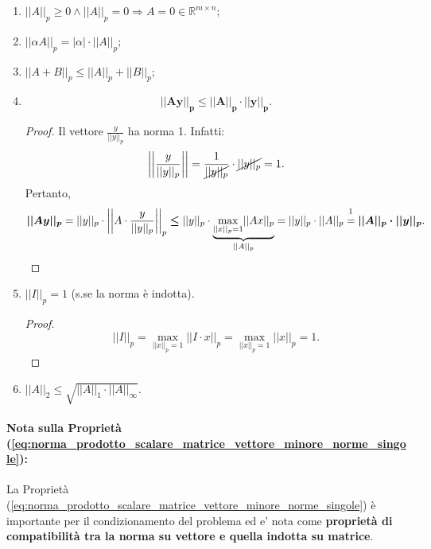 \begin{property}\label{prop:norme_indotte_matrici}
	\begin{enumerate}
		\item $||A||_p\geq 0 \wedge ||A||_p=0 \Rightarrow A=0\in\mathbb{R}^{m\times n};$
		\item $||\alpha A||_p=|\alpha|\cdot||A||_p;$
		\item $||A+B||_p\leq||A||_p+||B||_p;$
		\item 
		\begin{equation}\label{eq:norma_prodotto_scalare_matrice_vettore_minore_norme_singole}
			\boldsymbol{||Ay||_p\leq ||A||_p\cdot||y||_p}.
		\end{equation}
		\begin{proof}
			Il vettore $\frac{y}{||y||_p}$ ha norma 1. Infatti:
			\begin{equation}
				\left|\left|\frac{y}{||y||_p}\right|\right|=\frac{1}{\cancel{||y||_p}}\cdot\cancel{||y||_p}=1.
			\end{equation}
			Pertanto,
			\begin{equation*}
				\boldsymbol{||Ay||_p}=||y||_p\cdot\left|\left|A\cdot\frac{y}{||y||_p}\right|\right|_p\boldsymbol\leq ||y||_p\cdot\underbrace{\underset{||x||_p=1}{\max}||Ax||_p}_{||A||_p}=||y||_p\cdot||A||_p\overset{\footnotemark}{=}\boldsymbol{||A||_p\cdot||y||_p}.
			\end{equation*}
		\end{proof}
		\item $||I||_p=1$ (s.se la norma è indotta).
		\begin{proof}
			\begin{equation*}
				||I||_p=\underset{||x||_p=1}{\max}||I\cdot x||_p=\underset{||x||_p=1}{\max}||x||_p=1.
			\end{equation*}
		\end{proof}
		\item $||A||_2 \leq \sqrt{||A||_1\cdot ||A||_\infty}$.
	\end{enumerate}
\end{property}


\paragraph{Nota sulla Proprietà (\ref{eq:norma_prodotto_scalare_matrice_vettore_minore_norme_singole}):} La Proprietà (\ref{eq:norma_prodotto_scalare_matrice_vettore_minore_norme_singole}) è importante per il condizionamento del problema ed e' nota come \textbf{proprietà di compatibilità tra la norma su vettore e quella indotta su matrice}.

